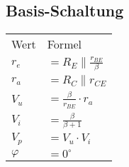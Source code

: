     \subsection{Basis-Schaltung}
    \begin{minipage}{0.3\columnwidth}
        \begin{table}[H]
            \begin{tabularx}{\columnwidth}{l l}
                Wert & Formel \\
                $r_e$ & $=R_E\parallel\frac{r_{BE}}{\beta}$ \\
                $r_a$ & $=R_C\parallel r_{CE} $ \\
                $V_u$ & $=\frac{\beta}{r_{BE}}\cdot r_a$ \\
                $V_i$ & $=\frac{\beta}{\beta +1}$ \\
                $V_p$ & $=V_u\cdot V_i$\\
                $\varphi$ & $=0^{\circ}$ \\ %
            \end{tabularx}
        \end{table}
    \end{minipage}
    \begin{minipage}{0.7\columnwidth}
        
    \end{minipage}
